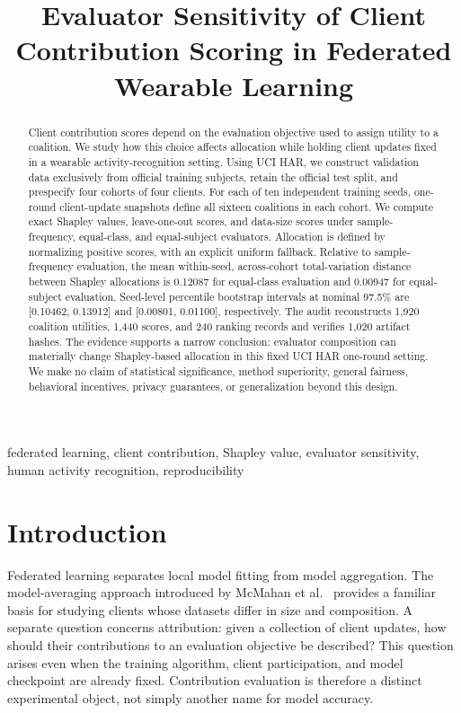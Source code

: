 \documentclass[conference,letterpaper]{IEEEtran}
\title{Evaluator Sensitivity of Client Contribution Scoring in Federated Wearable Learning}
\author{\IEEEauthorblockN{Author information pending confirmation}}
\begin{document}
\maketitle
\begin{abstract}
Client contribution scores depend on the evaluation objective used to assign utility to a coalition. We study how this choice affects allocation while holding client updates fixed in a wearable activity-recognition setting. Using UCI HAR, we construct validation data exclusively from official training subjects, retain the official test split, and prespecify four cohorts of four clients. For each of ten independent training seeds, one-round client-update snapshots define all sixteen coalitions in each cohort. We compute exact Shapley values, leave-one-out scores, and data-size scores under sample-frequency, equal-class, and equal-subject evaluators. Allocation is defined by normalizing positive scores, with an explicit uniform fallback. Relative to sample-frequency evaluation, the mean within-seed, across-cohort total-variation distance between Shapley allocations is 0.12087 for equal-class evaluation and 0.00947 for equal-subject evaluation. Seed-level percentile bootstrap intervals at nominal 97.5\% are [0.10462, 0.13912] and [0.00801, 0.01100], respectively. The audit reconstructs 1,920 coalition utilities, 1,440 scores, and 240 ranking records and verifies 1,020 artifact hashes. The evidence supports a narrow conclusion: evaluator composition can materially change Shapley-based allocation in this fixed UCI HAR one-round setting. We make no claim of statistical significance, method superiority, general fairness, behavioral incentives, privacy guarantees, or generalization beyond this design.
\end{abstract}
\begin{IEEEkeywords}
federated learning, client contribution, Shapley value, evaluator sensitivity, human activity recognition, reproducibility
\end{IEEEkeywords}

\section{Introduction}
Federated learning separates local model fitting from model aggregation. The model-averaging approach introduced by McMahan et al.~\cite{fedavg} provides a familiar basis for studying clients whose datasets differ in size and composition. A separate question concerns attribution: given a collection of client updates, how should their contributions to an evaluation objective be described? This question arises even when the training algorithm, client participation, and model checkpoint are already fixed. Contribution evaluation is therefore a distinct experimental object, not simply another name for model accuracy.
\end{document}

